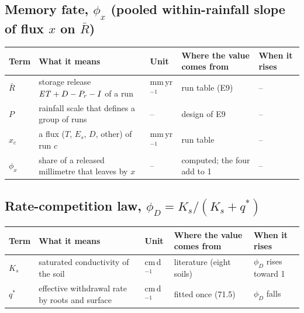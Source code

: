\subsection*{Memory fate, $\phi_x$ (pooled within-rainfall slope of flux $x$ on $\bar R$)}
{\small\begin{longtable}{>{\raggedright\arraybackslash}p{}>{\raggedright\arraybackslash}p{}>{\raggedright\arraybackslash}p{}>{\raggedright\arraybackslash}p{}>{\raggedright\arraybackslash}p{}}\toprule Term & What it means & Unit & Where the value comes from & When it rises\\\midrule\endhead
$\bar R$ & storage release $\mathit{ET}+D-P_r-I$ of a run & mm\,yr$^{-1}$ & run table (E9) & --\\
$P$ & rainfall scale that defines a group of runs & -- & design of E9 & --\\
$x_c$ & a flux ($T$, $E_s$, $D$, other) of run $c$ & mm\,yr$^{-1}$ & run table & --\\
$\phi_x$ & share of a released millimetre that leaves by $x$ & -- & computed; the four add to 1 & --\\
\bottomrule\end{longtable}}
\subsection*{Rate-competition law, $\phi_D=K_s/(K_s+q^\ast)$}
{\small\begin{longtable}{>{\raggedright\arraybackslash}p{}>{\raggedright\arraybackslash}p{}>{\raggedright\arraybackslash}p{}>{\raggedright\arraybackslash}p{}>{\raggedright\arraybackslash}p{}}\toprule Term & What it means & Unit & Where the value comes from & When it rises\\\midrule\endhead
$K_s$ & saturated conductivity of the soil & cm\,d$^{-1}$ & literature (eight soils) & $\phi_D$ rises toward 1\\
$q^\ast$ & effective withdrawal rate by roots and surface & cm\,d$^{-1}$ & fitted once (71.5) & $\phi_D$ falls\\
\bottomrule\end{longtable}}
